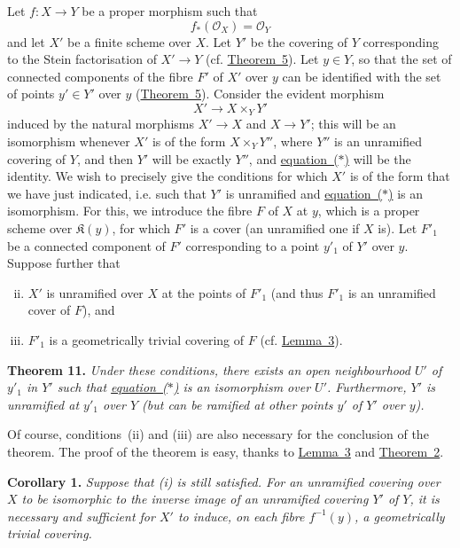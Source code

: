 \documentclass{article}
\newenvironment{itenv}[1]
  {\phantomsection\par\medskip\noindent\textbf{#1.}\itshape}
  {\medskip}
\newcommand{\scr}[1]{{\mathscr{#1}}}
\newcommand{\kres}{\mathfrak{K}}
\newcommand{\oldpage}[1]{\marginpar{\footnotesize$\Big\vert$ \textit{p.~#1}}}
\begin{document}
Let $f\colon X\to Y$ be a proper morphism such that
\[
\label{equationi}
  f_*(\scr{O}_X) = \scr{O}_Y
\tag{i}
\]
and let $X'$ be a finite scheme over $X$.
Let $Y'$ be the covering of $Y$ corresponding to the Stein factorisation of $X'\to Y$ (cf. \hyperref[theorem5]{Theorem~5}).
Let $y\in Y$, so that the set of connected components of the fibre $F'$ of $X'$ over $y$ can be identified with the set of points $y'\in Y'$ over $y$ (\hyperref[theorem5]{Theorem~5}).
Consider the evident morphism
\[
\label{equation*}
  X'\to X\times_Y Y'
\tag{$*$}
\]
induced by the natural morphisms $X'\to X$ and $X\to Y'$;
this will be an isomorphism whenever $X'$ is of the form $X\times_Y Y''$, where $Y''$ is an unramified covering of $Y$, and then $Y'$ will be exactly $Y''$, and \hyperref[equation*]{equation~($*$)} will be the identity.
We wish to precisely give the conditions for which $X'$ is of the form that we have just indicated, i.e. such that $Y'$ is unramified and \hyperref[equation*]{equation~($*$)} is an isomorphism.
For this, we introduce the fibre $F$ of $X$ at $y$, which is a proper scheme over $\kres(y)$, for which $F'$ is a cover (an unramified one if $X$ is).
Let $F'_1$ be a connected component of $F'$ corresponding to a point $y'_1$ of $Y'$ over $y$.
Suppose further that
\begin{enumerate}[(i)]
\setcounter{enumi}{1}
  \item $X'$ is unramified over $X$ at the points of $F'_1$ (and thus $F'_1$ is an unramified cover of $F$), and
  \item $F'_1$ is a geometrically trivial covering of $F$ (cf. \hyperref[lemma3]{Lemma~3}).
\end{enumerate}

\begin{itenv}{Theorem 11}
\label{theorem11}
  Under these conditions, there exists an open neighbourhood $U'$ of $y'_1$
\oldpage{182-22}
  in $Y'$ such that \hyperref[equation*]{equation~($*$)} is an isomorphism over $U'$.
  Furthermore, $Y'$ is unramified at $y'_1$ over $Y$ (but can be ramified at other points $y'$ of $Y'$ over $y$).
\end{itenv}

Of course, conditions~(ii) and (iii) are also necessary for the conclusion of the theorem.
The proof of the theorem is easy, thanks to \hyperref[lemma3]{Lemma~3} and \hyperref[theorem2]{Theorem~2}.

\begin{itenv}{Corollary 1}
\label{theorem11corollary1}
  Suppose that (i) is still satisfied.
  For an unramified covering over $X$ to be isomorphic to the inverse image of an unramified covering $Y'$ of $Y$, it is necessary and sufficient for $X'$ to induce, on each fibre $f^{-1}(y)$, a geometrically trivial covering.
\end{itenv}
\end{document}

